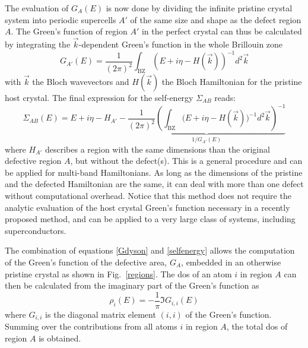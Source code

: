 The evaluation of $G_A(E)$ is now done by dividing the infinite pristine crystal system into periodic supercells $A'$ of the same size and shape as the defect region $A$.
The Green's function of region $A'$ in the perfect crystal can thus be calculated by integrating the $\vec{k}$-dependent Green's function in the whole Brillouin zone
\begin{equation}
  G_{A'}(E) =
\frac{1}{(2\pi)^2}
\int_{\text{BZ}} (E+i\eta-H(\vec{k}))^{-1} d^2\vec{k}
  \label{Gbloch}
\end{equation}
with $\vec{k}$ {the Bloch wavevectors}
and $H(\vec{k})$ the Bloch Hamiltonian for the pristine host
crystal. The final expression for the self-energy $\Sigma_{AB}$ reads:
\begin{equation}
  \Sigma_{AB}(E) = E+i\eta - H_{A'} -
  \underbrace{
\frac{1}{(2\pi)^2}
\left ({\int_{\text{BZ}}
(E+i\eta-H(\vec{k})})^{-1}d^2\vec{k} \right )^{-1}
}_{1/G_{A'}(E)}
\label{selfenergy}
\end{equation}
where $H_{A'}$ describes a region with the same dimensions than the original defective region $A$, but without the defect(s). This is a general procedure and can be applied for multi-band Hamiltonians. As long as the dimensions of the pristine and the defected Hamiltonian are the same, it can deal with more than one defect without computational overhead. Notice that this method does not require the analytic evaluation of the host crystal Green's function necessary in a recently proposed method\cite{Settnes2015}, and can be applied to a very large class of systems, including superconductors.\cite{Lado2016}

The combination of equations \eqref{Gdyson} and \eqref{selfenergy} allows the computation of the Green's function of the defective area, $G_A$, embedded in an otherwise pristine crystal as shown in Fig.~\ref{regions}. The \ac{dos} of an atom $i$ in region $A$ can then be calculated from the imaginary part of the Green's function as
\begin{equation}
  \rho_{i}(E) = -\frac{1}{\pi}\Im{G_{i,i}(E)}
  \label{eq:DOS}
\end{equation}
where $G_{i,i}$ is the diagonal matrix element $(i,i)$ of the Green's function. Summing over the contributions from all atoms $i$ in region $A$, the total \ac{dos} of region $A$ is obtained.

